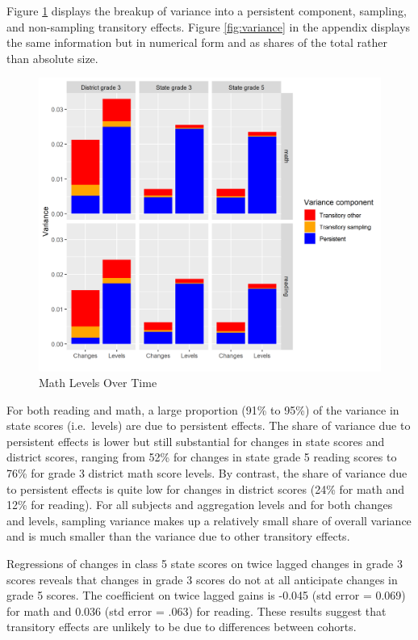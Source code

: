 \documentclass[
  11pt,
]{article}
\begin{document}
Figure \ref{fig:combinedbarchart} displays the breakup of variance into a persistent component, sampling, and non-sampling transitory effects. Figure \ref{fig:variance} in the appendix displays the same information but in numerical form and as shares of the total rather than absolute size.

\begin{figure}

{\centering \includegraphics[width=0.9\linewidth]{Combined bar chart} 

}

\caption{Math Levels Over Time}\label{fig:combinedbarchart}
\end{figure}

For both reading and math, a large proportion (91\% to 95\%) of the variance in state scores (i.e.~levels) are due to persistent effects. The share of variance due to persistent effects is lower but still substantial for changes in state scores and district scores, ranging from 52\% for changes in state grade 5 reading scores to 76\% for grade 3 district math score levels. By contrast, the share of variance due to persistent effects is quite low for changes in district scores (24\% for math and 12\% for reading). For all subjects and aggregation levels and for both changes and levels, sampling variance makes up a relatively small share of overall variance and is much smaller than the variance due to other transitory effects.

Regressions of changes in class 5 state scores on twice lagged changes in grade 3 scores reveals that changes in grade 3 scores do not at all anticipate changes in grade 5 scores. The coefficient on twice lagged gains is -0.045 (std error = 0.069) for math and 0.036 (std error = .063) for reading. These results suggest that transitory effects are unlikely to be due to differences between cohorts.
\end{document}
